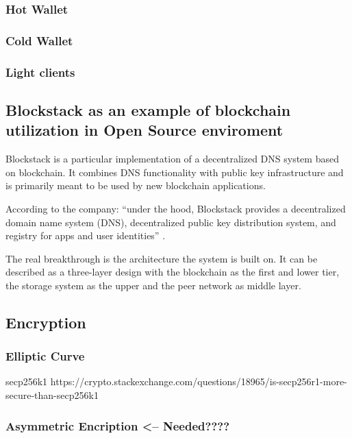 \subsubsection{Hot Wallet}
\subsubsection{Cold Wallet}

\subsubsection{Light clients}

\subsection{Blockstack as an example of blockchain utilization in Open Source enviroment}
Blockstack is a particular implementation of a decentralized DNS system based on blockchain. It combines DNS functionality with public key infrastructure and is primarily meant to be used by new blockchain applications.

According to the company: \enquote{under the hood, Blockstack provides a decentralized domain name system (DNS), decentralized public key distribution system, and registry for apps and user identities} \cite{BlockStackMainPage}.

The real breakthrough is the architecture the system is built on. It can be described as a three-layer design with the blockchain as the first and lower tier, the storage system as the upper and the peer network as middle layer.

\subsection{Encryption}
\subsubsection{Elliptic Curve}
secp256k1
https://crypto.stackexchange.com/questions/18965/is-secp256r1-more-secure-than-secp256k1

\subsubsection{Asymmetric Encription <-- Needed????}



